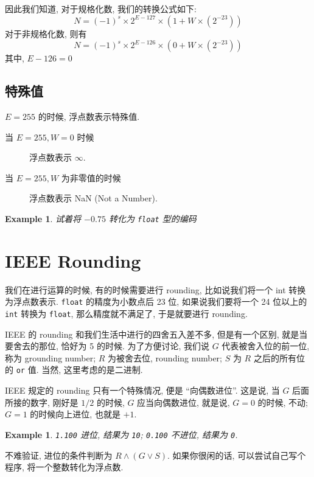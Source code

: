 \documentclass[12pt]{ctexart}
\theoremstyle{definition}
\theoremstyle{plain}
\newtheorem{exam}[definition]{Example}
\begin{document}
因此我们知道, 对于规格化数, 我们的转换公式如下: 
\begin{equation}
N = (-1) ^{s} \times 2 ^{E - 127} \times (1 + W \times (2 ^{-23} ))
\end{equation}
对于非规格化数, 则有
\begin{equation}
N = (-1) ^{s} \times 2 ^{E - 126} \times (0 + W \times (2 ^{-23}))
\end{equation}
其中, \(E - 126 = 0\)

\subsection{特殊值}
\(E = 255\) 的时候, 浮点数表示特殊值. 
\begin{description}
\item [当 \(E  = 255 ,W = 0\) 时候] 浮点数表示 \(\infty\).  
\item [当 \(E = 255, W\) 为非零值的时候] 浮点数表示 NaN (Not a Number).
\end{description}


\begin{exam}
试着将 \(-0.75\) 转化为 \verb|float| 型的编码
\end{exam}


\section{IEEE Rounding}
我们在进行运算的时候, 有的时候需要进行 rounding, 比如说我们将一个 int 转换为浮点数表示. 
\verb|float| 的精度为小数点后 23 位, 如果说我们要将一个 24 位以上的 \verb|int| 转换为 \verb|float|, 
那么精度就不满足了, 于是就要进行 rounding. 

IEEE 的 rounding 和我们生活中进行的四舍五入差不多, 但是有一个区别, 就是当要舍去的那位, 恰好为 5 的时候. 
为了方便讨论, 我们说 \(G\) 代表被舍入位的前一位, 称为 grounding number; \(R\) 为被舍去位, rounding number; \(S\) 为 \(R\) 之后的所有位的 \verb|or| 值. 当然, 这里考虑的是二进制. 

IEEE 规定的 rounding 只有一个特殊情况, 便是 ``向偶数进位''. 这是说, 当 \(G\) 后面所接的数字, 刚好是 \(1/2\) 的时候, \(G\) 应当向偶数进位, 就是说, \(G = 0\) 的时候, 不动; \(G = 1\) 的时候向上进位, 也就是 \(+1\).  

\begin{exam}
\verb|1.100| 进位, 结果为 \verb|10|; \verb|0.100| 不进位, 结果为 \verb|0|. 
\end{exam}
不难验证, 进位的条件判断为 \(R \land (G \lor S)\). 如果你很闲的话, 可以尝试自己写个程序, 将一个整数转化为浮点数. 
\end{document}
